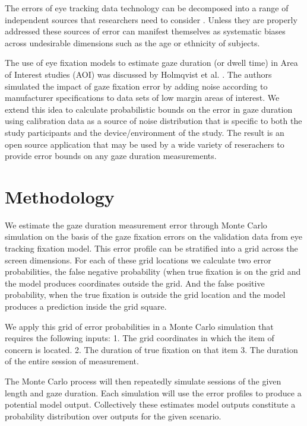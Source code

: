 \documentclass[12pt,a4paper]{article}
\numberwithin{equation}{section}
\begin{document}
The errors of eye tracking data technology can be decomposed into a range of
independent sources that researchers need to consider \cite{Holmqvist2012}.
Unless they are properly addressed these sources of error can manifest themselves
as systematic biases across undesirable dimensions such as the age\cite{Dalrymple2018}
or ethnicity of subjects\cite{Blignaut2013}. 

The use of eye fixation models to estimate gaze duration (or dwell time) in Area of
Interest studies (AOI) was discussed by Holmqvist et al. \cite{Holmqvist2012}. The
authors simulated the impact of gaze fixation error by adding noise according to
manufacturer specifications to data sets of low margin areas of interest. We extend 
this idea to calculate probabilistic bounds on the error in gaze duration using
calibration data as a source of noise distribution that is specific to both the
study participants and the device/environment of the study. The result is an open
source application that may be used by a wide variety of reserachers to provide
error bounds on any gaze duration measurements.


\section{Methodology}

We estimate the gaze duration measurement error through Monte Carlo simulation
on the basis of the gaze fixation errors on the validation data from eye tracking
fixation model. This error profile can be stratified into a grid across the screen dimensions. 
For each of these grid locations we calculate two error probabilities, the false negative 
probability (when true fixation is on the grid and the model produces coordinates outside the grid. 
And the false positive probability, when the true fixation is outside the grid location and the model produces a prediction inside the grid square.

We apply this grid of error probabilities in a Monte Carlo simulation that requires the following inputs:
1.	The grid coordinates in which the item of concern is located.
2.	The duration of true fixation on that item
3.	The duration of the entire session of measurement.

The Monte Carlo process will then repeatedly simulate sessions of the given length and gaze duration. Each simulation will use the error profiles to produce a potential model output. Collectively these estimates model outputs constitute a probability distribution over outputs for the given scenario.
\end{document}
